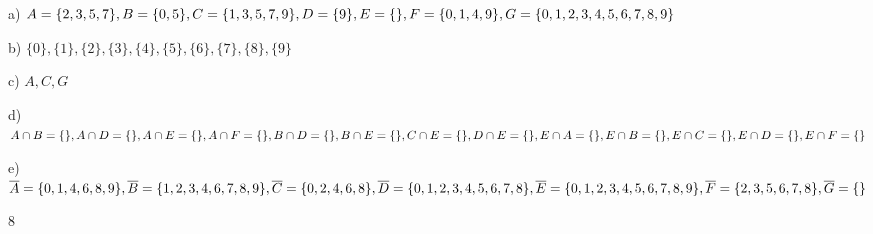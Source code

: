 {\begin{enumerate}[label=\alph*)]
\end{enumerate}
}{%

a) $A = \{2, 3, 5, 7\}, B = \{0, 5\}, C = \{1, 3, 5, 7, 9\}, D = \{9\}, E = \{\}, F = \{0, 1, 4, 9\},\\ G = \{0, 1, 2, 3, 4, 5, 6, 7, 8, 9\}$

b) $\{0\}, \{1\}, \{2\}, \{3\}, \{4\}, \{5\}, \{6\}, \{7\}, \{8\}, \{9\}$

c) $A, C, G$

d) $A \cap B = \{\}, A \cap D = \{\}, A \cap E = \{\}, A \cap F = \{\}, B \cap D = \{\}, B \cap  E = \{\},\\ C \cap E = \{\}, D \cap E = \{\}, E \cap A = \{\}, E  \cap B = \{\}, E  \cap C = \{\}, E  \cap D = \{\}, E  \cap F = \{\}$

e) $\overline{A} = \{0, 1, 4, 6, 8, 9\}, \overline{B} = \{1, 2, 3, 4, 6, 7, 8, 9\}, \overline{C} = \{0, 2, 4, 6, 8\}, \overline{D} = \{0, 1, 2, 3, 4, 5, 6, 7, 8\},\\
\overline{E} = \{0, 1, 2, 3, 4, 5, 6, 7, 8, 9\}, \overline{F} = \{2, 3, 5, 6, 7, 8\}, \overline{G} = \{\}$
}{8}


